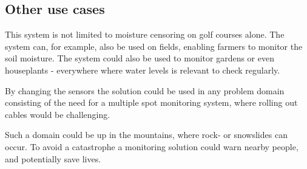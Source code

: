 \subsection{Other use cases}
This system is not limited to moisture censoring on golf courses alone. The system can, for example, also be used on fields, enabling farmers to monitor the soil moisture. The system could also be used to monitor gardens or even houseplants - everywhere where water levels is relevant to check regularly.

By changing the sensors the solution could be used in any problem domain consisting of the need for a multiple spot monitoring system, where rolling out cables would be challenging.

Such a domain could be up in the mountains, where rock- or snowslides can occur. To avoid a catastrophe a monitoring solution could warn nearby people, and potentially save lives.